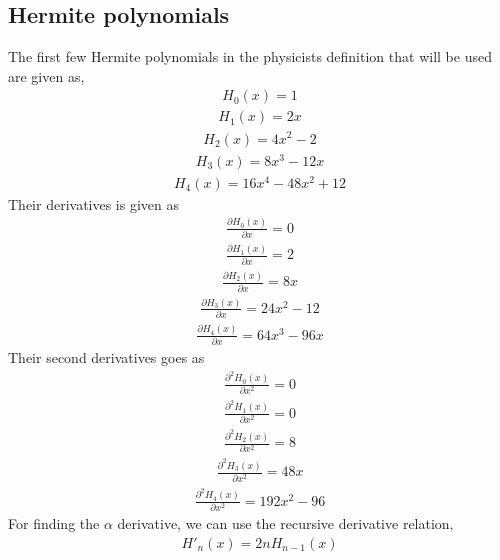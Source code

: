 \documentclass[11pt]{article}
\begin{document}
\begin{appendices}
	\section{Hermite polynomials}
	The first few Hermite polynomials in the physicists definition that will be used are given as,
	\begin{align*}
		H_0(x) = 1
	\end{align*}
	\begin{align*}
		H_1(x) = 2x
	\end{align*}
	\begin{align*}
		H_2(x) = 4x^2 - 2
	\end{align*}
	\begin{align*}
		H_3(x) = 8x^3 - 12x
	\end{align*}
	\begin{align*}
		H_4(x) = 16x^4 - 48x^2 + 12
	\end{align*}
	Their derivatives is given as
	\begin{align*}
		\frac{\partial H_0(x)}{\partial x} = 0
	\end{align*}
	\begin{align*}
		\frac{\partial H_1(x)}{\partial x} = 2
	\end{align*}
	\begin{align*}
		\frac{\partial H_2(x)}{\partial x} = 8x
	\end{align*}
	\begin{align*}
		\frac{\partial H_3(x)}{\partial x} = 24x^2 - 12
	\end{align*}
	\begin{align*}
		\frac{\partial H_4(x)}{\partial x} = 64x^3 - 96x
	\end{align*}
	Their second derivatives goes as
	\begin{align*}
		\frac{\partial^2 H_0(x)}{\partial x^2} = 0
	\end{align*}
	\begin{align*}
		\frac{\partial^2 H_1(x)}{\partial x^2} = 0
	\end{align*}
	\begin{align*}
		\frac{\partial^2 H_2(x)}{\partial x^2} = 8
	\end{align*}
	\begin{align*}
		\frac{\partial^2 H_3(x)}{\partial x^2} = 48x
	\end{align*}
	\begin{align*}
		\frac{\partial^2 H_4(x)}{\partial x^2} = 192x^2 - 96
	\end{align*}
	For finding the $\alpha$ derivative, we can use the recursive derivative relation,
	\begin{align}
		H'_n(x) = 2nH_{n-1}(x)
		\label{eq:hermite-recursive-relation}
	\end{align}


\end{appendices}
\end{document}
